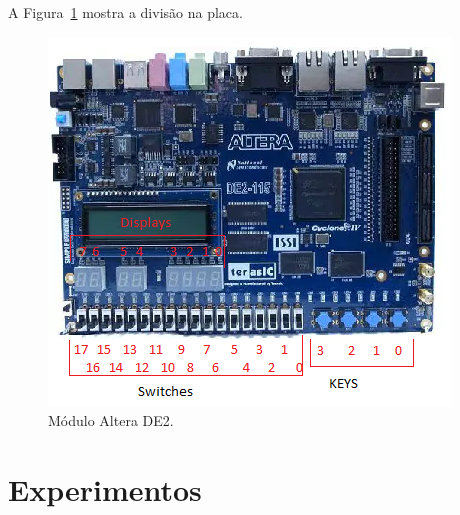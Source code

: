 \documentclass[11pt,a4paper,titlepage]{article}
\begin{document}
A Figura~\ref{fig:fpga} mostra a divisão na placa.

\begin{figure}[h]
\centering
\includegraphics[]{images/FPGA.png}
\caption{Módulo Altera DE2.}
\label{fig:fpga}
\end{figure}


\section{Experimentos}
\end{document}
